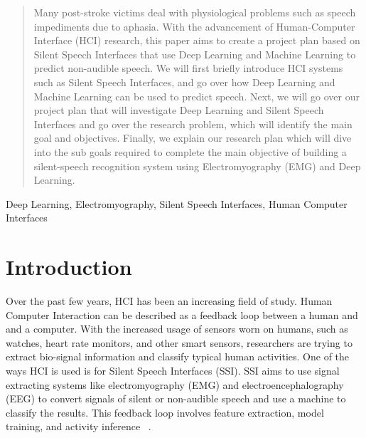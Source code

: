\documentclass[conference]{IEEEtran}
\begin{document}
\begin{abstract}
Many post-stroke victims deal with physiological problems such as speech impediments due to aphasia. With the advancement of Human-Computer Interface (HCI)
research, this paper aims to create a project plan based on Silent Speech Interfaces that use Deep Learning and Machine Learning to predict non-audible speech. We will first briefly introduce HCI systems such as Silent Speech Interfaces, and go over how
Deep Learning and Machine Learning can be used to predict speech. Next, we will go over our project plan that will investigate Deep Learning and Silent Speech
Interfaces and go over the research problem, which will identify the main goal and objectives. Finally, we explain our research plan which will dive into the
sub goals required to complete the main objective of building a silent-speech recognition system using Electromyography (EMG) and Deep Learning.
\end{abstract}

\begin{IEEEkeywords}
Deep Learning, Electromyography, Silent Speech Interfaces, Human Computer Interfaces
\end{IEEEkeywords}


%
\IEEEpeerreviewmaketitle


\section{Introduction}
Over the past few years, HCI has been an increasing field of study. Human Computer Interaction can be described as a feedback loop between a human and and a computer. With the increased usage of sensors worn on humans, such as watches, heart rate monitors, and other smart sensors, researchers are trying to extract bio-signal information and classify typical human activities. One of the ways HCI is used is for Silent Speech Interfaces (SSI). SSI aims to use signal extracting systems like electromyography (EMG) and
electroencephalography (EEG) to convert signals of silent or non-audible speech and use a machine to classify the results. This feedback loop involves feature extraction, model training, and activity inference ~\cite{lukas_masuch_deep_nodate}.
\end{document}
